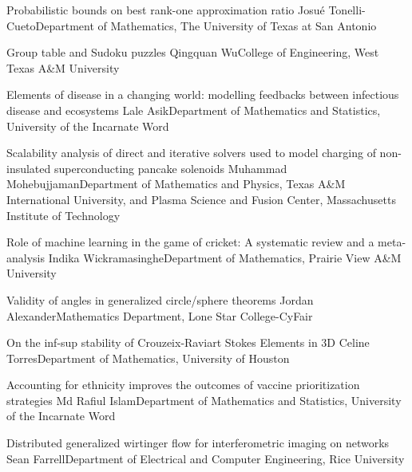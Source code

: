\begin{postersPF}
\label{poster}

\item\poster %
{Probabilistic bounds on best rank-one approximation ratio}
{Josu\'e Tonelli-Cueto}{Department of Mathematics, The University of Texas at San Antonio}

\item\poster %
{Group table and Sudoku puzzles}
{Qingquan Wu}{College of Engineering, West Texas A\&M University}

\item\poster %
{Elements of disease in a changing world: modelling feedbacks between infectious disease and ecosystems}
{Lale Asik}{Department of Mathematics and Statistics, University of the Incarnate Word}

\item\poster %
{Scalability analysis of direct and iterative solvers used to model charging of non-insulated superconducting pancake solenoids}
{Muhammad Mohebujjaman}{Department of Mathematics and Physics, Texas A\&M International University, and Plasma Science and Fusion Center, Massachusetts Institute of Technology}

\item\poster %
{Role of machine learning in the game of cricket: A systematic review and a meta-analysis}
{Indika Wickramasinghe}{Department of Mathematics, Prairie View A\&M University}

\item\poster %
{Validity of angles in generalized circle/sphere theorems}
{Jordan Alexander}{Mathematics Department, Lone Star College-CyFair}

\item\poster %
{On the inf-sup stability of Crouzeix-Raviart Stokes Elements in 3D}
{Celine Torres}{Department of Mathematics, University of Houston}

\item\poster %
{Accounting for ethnicity improves the outcomes of  vaccine prioritization strategies}
{Md Rafiul Islam}{Department of Mathematics and Statistics, University of the Incarnate Word}

\item\poster %
{Distributed generalized wirtinger flow for interferometric imaging on networks}
{Sean Farrell}{Department of Electrical and Computer Engineering, Rice University}

\end{postersPF}


